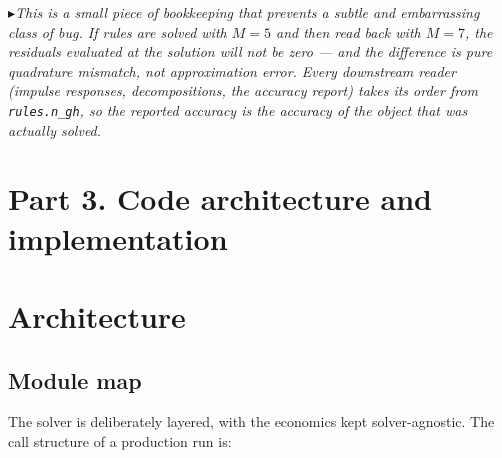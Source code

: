 \documentclass[11pt]{article}
\numberwithin{equation}{section}
\newcommand{\code}[1]{\texttt{\small #1}}
\theoremstyle{definition}
\theoremstyle{plain}
\theoremstyle{remark}
\newcommand{\trick}[1]{\par\smallskip\noindent
  \textcolor{notec}{$\blacktriangleright$}\;\emph{#1}\par\smallskip}
\begin{document}
\trick{This is a small piece of bookkeeping that prevents a subtle and embarrassing
class of bug. If rules are solved with $M=5$ and then read back with $M=7$, the
residuals evaluated at the solution will not be zero --- and the difference is pure
quadrature mismatch, not approximation error. Every downstream reader (impulse
responses, decompositions, the accuracy report) takes its order from
\code{rules.n\_gh}, so the reported accuracy is the accuracy of the object that was
actually solved.}

\clearpage
\section*{Part 3. Code architecture and implementation}

\section{Architecture}
\label{sec:architecture}

\subsection{Module map}

The solver is deliberately layered, with the economics kept solver-agnostic. The
call structure of a production run is:
\end{document}

